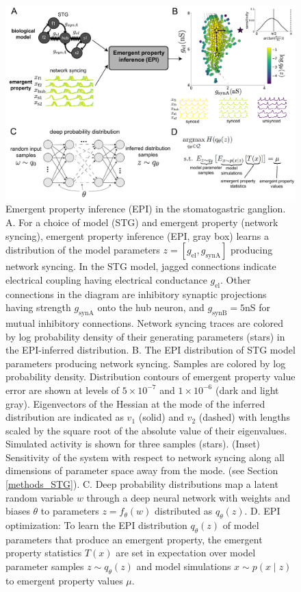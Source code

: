 \documentclass[11pt]{article}
\begin{document}
\begin{figure}
\begin{center}
\includegraphics[scale=0.35]{figures/fig1/fig1.pdf}
\end{center}
\caption{Emergent property inference (EPI) in the stomatogastric ganglion.  A. For a choice of model (STG) and emergent property (network syncing), emergent property inference (EPI, gray box) learns a distribution of the model parameters $z = \left[g_{\text{el}}, g_{\text{synA}} \right]$ producing network syncing.  In the STG model, jagged connections indicate electrical coupling having electrical conductance $g_{\text{el}}$. Other connections in the diagram are inhibitory synaptic projections having strength $g_{\text{synA}}$ onto the hub neuron, and $g_{\text{synB}}=5$nS for mutual inhibitory connections.  Network syncing traces are colored by log probability density of their generating parameters (stars) in the EPI-inferred distribution.  B. The EPI distribution of STG model parameters producing network syncing.  Samples are colored by log probability density.  Distribution contours of emergent property value error are shown at levels of $5 \times 10^{-7}$ and $1 \times 10^{-6}$ (dark and light gray).  Eigenvectors of the Hessian at the mode of the inferred distribution are indicated as $v_1$ (solid) and $v_2$ (dashed) with lengths scaled by the square root of the absolute value of their eigenvalues.  Simulated activity is shown for three samples (stars). (Inset) Sensitivity of the system with respect to network syncing along all dimensions of parameter space away from the mode. (see Section \ref{methods_STG}).  C. Deep probability distributions map a latent random variable $w$ through a deep neural network with weights and biases $\theta$ to parameters $z = f_\theta(w)$ distributed as $q_\theta(z)$. D. EPI optimization: To learn the EPI distribution $q_\theta(z)$ of model parameters that produce an emergent property, the emergent property statistics $T(x)$ are set in expectation over model parameter samples $z \sim q_\theta(z)$ and model simulations $x \sim p(x \mid z)$ to emergent property values $\mu$.}
 \label{fig:STG}
\end{figure}
\end{document}
